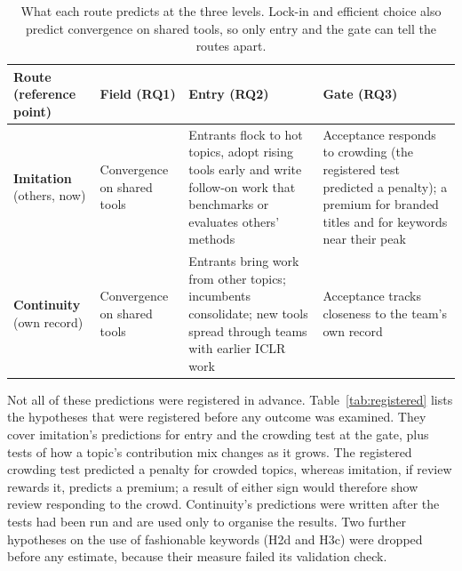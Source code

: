 \begin{table}[tb]
\centering
\footnotesize
\setlength{\tabcolsep}{3pt}
\renewcommand{\arraystretch}{1.15}
\begin{tabularx}{\textwidth}{@{}L{2.1cm} L{2.2cm} Y L{3.9cm}@{}}
\toprule
Route (reference point) & Field (RQ1) & Entry (RQ2) & Gate (RQ3) \\
\midrule
\textbf{Imitation} (others, now) & Convergence on shared tools & Entrants flock to hot topics, adopt rising tools early
and write follow-on work that benchmarks or evaluates others' methods & Acceptance responds to crowding (the registered
test predicted a penalty); a premium for branded titles and for keywords near their peak \\
\addlinespace
\textbf{Continuity} (own record) & Convergence on shared tools & Entrants bring work from other topics; incumbents
consolidate; new tools spread through teams with earlier ICLR work & Acceptance tracks closeness to the team's own
record \\
\bottomrule
\end{tabularx}
\caption[What each route predicts for the field, at entry and at the gate]{What each route predicts at the three
levels. Lock-in and efficient choice also predict convergence on shared tools, so only entry and the gate can tell the
routes apart.}
\label{tab:predictions}
\end{table}

Not all of these predictions were registered in advance. Table~\ref{tab:registered} lists the hypotheses that were
registered before any outcome was examined. They cover imitation's predictions for entry and the crowding test at the
gate, plus tests of how a topic's contribution mix changes as it grows. The registered crowding test predicted a
penalty for crowded topics, whereas imitation, if review rewards it, predicts a premium; a result of either sign would
therefore show review responding to the crowd. Continuity's predictions were written after the tests had been run and
are used only to organise the results. Two further hypotheses on the use of fashionable keywords (H2d and H3c) were
dropped before any estimate, because their measure failed its validation check.

